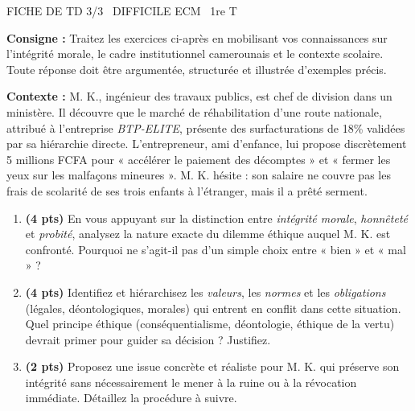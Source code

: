 \documentclass[11pt]{article}
\begin{document}
\begin{tcolorbox}[enhanced,colback=popink,colframe=popink,arc=10pt,boxrule=0pt,left=12pt,right=12pt,top=9pt,bottom=9pt]
{\color{white}\popxbold\small FICHE DE TD 3/3 \textbullet\ DIFFICILE \hfill ECM \textbullet\ 1re T\par}
\end{tcolorbox}
\vspace{4pt}
\noindent \textbf{Consigne :} Traitez les exercices ci-après en mobilisant vos connaissances sur l'intégrité morale, le cadre institutionnel camerounais et le contexte scolaire. Toute réponse doit être argumentée, structurée et illustrée d'exemples précis.

\begin{exercice}
\textbf{Contexte :} M. K., ingénieur des travaux publics, est chef de division dans un ministère. Il découvre que le marché de réhabilitation d'une route nationale, attribué à l'entreprise \textit{BTP-ELITE}, présente des surfacturations de 18\% validées par sa hiérarchie directe. L'entrepreneur, ami d'enfance, lui propose discrètement 5 millions FCFA pour « accélérer le paiement des décomptes » et « fermer les yeux sur les malfaçons mineures ». M. K. hésite : son salaire ne couvre pas les frais de scolarité de ses trois enfants à l'étranger, mais il a prêté serment.

\begin{enumerate}
    \item \textbf{(4 pts)} En vous appuyant sur la distinction entre \textit{intégrité morale}, \textit{honnêteté} et \textit{probité}, analysez la nature exacte du dilemme éthique auquel M. K. est confronté. Pourquoi ne s'agit-il pas d'un simple choix entre « bien » et « mal » ?
    \item \textbf{(4 pts)} Identifiez et hiérarchisez les \textit{valeurs}, les \textit{normes} et les \textit{obligations} (légales, déontologiques, morales) qui entrent en conflit dans cette situation. Quel principe éthique (conséquentialisme, déontologie, éthique de la vertu) devrait primer pour guider sa décision ? Justifiez.
    \item \textbf{(2 pts)} Proposez une issue concrète et réaliste pour M. K. qui préserve son intégrité sans nécessairement le mener à la ruine ou à la révocation immédiate. Détaillez la procédure à suivre.
\end{enumerate}
\end{exercice}
\end{document}
